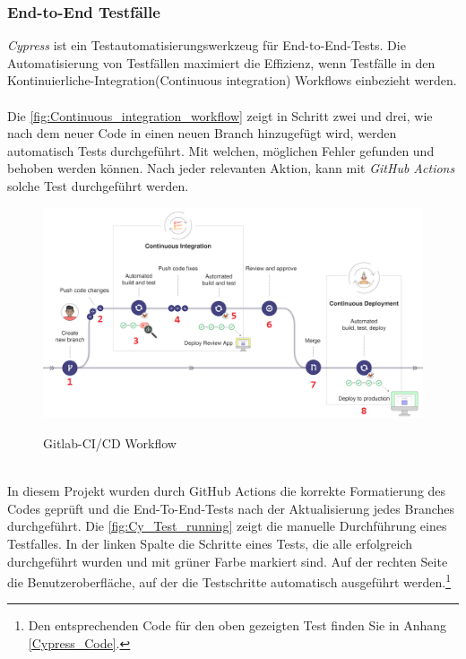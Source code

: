 \subsubsection*{End-to-End Testfälle}
\textit{Cypress} ist ein Testautomatisierungswerkzeug für End-to-End-Tests. 
Die Automatisierung von Testfällen maximiert die Effizienz, wenn Testfälle in den Kontinuierliche-Integration(Continuous integration) Workflows einbezieht werden. %
\\\\
Die \autoref{fig:Continuous_integration_workflow} zeigt in Schritt zwei und drei, wie nach dem neuer Code in einen neuen Branch hinzugefügt wird, werden automatisch Tests durchgeführt. Mit welchen, möglichen Fehler gefunden und behoben werden können. Nach jeder relevanten Aktion, kann mit \textit{GitHub Actions} solche Test durchgeführt werden.
\begin{figure}[h!]
	\centering
    \includegraphics[width=\textwidth]{sources/Gitlab-CI.png}
	\caption{Gitlab-CI/CD Workflow}
	\label{fig:Continuous_integration_workflow} {\cite{GLAB1}}
\end{figure}
\\
In diesem Projekt wurden durch GitHub Actions die korrekte Formatierung des Codes geprüft und die End-To-End-Tests nach der Aktualisierung jedes Branches durchgeführt.
\newpage
Die \autoref{fig:Cy_Test_running} zeigt die manuelle Durchführung eines Testfalles. In der linken Spalte die Schritte eines Tests, die alle erfolgreich durchgeführt wurden und mit grüner Farbe markiert sind. Auf der rechten Seite die Benutzeroberfläche, auf der die Testschritte automatisch ausgeführt werden.\footnote{Den entsprechenden Code für den oben gezeigten Test finden Sie in Anhang \ref{Cypress_Code}.
}
